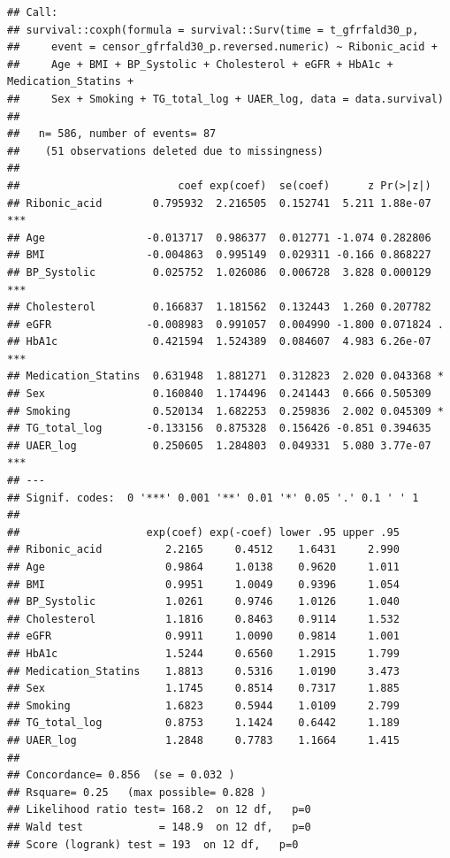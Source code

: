 \documentclass[]{article}
\begin{document}
\begin{verbatim}
## Call:
## survival::coxph(formula = survival::Surv(time = t_gfrfald30_p, 
##     event = censor_gfrfald30_p.reversed.numeric) ~ Ribonic_acid + 
##     Age + BMI + BP_Systolic + Cholesterol + eGFR + HbA1c + Medication_Statins + 
##     Sex + Smoking + TG_total_log + UAER_log, data = data.survival)
## 
##   n= 586, number of events= 87 
##    (51 observations deleted due to missingness)
## 
##                         coef exp(coef)  se(coef)      z Pr(>|z|)    
## Ribonic_acid        0.795932  2.216505  0.152741  5.211 1.88e-07 ***
## Age                -0.013717  0.986377  0.012771 -1.074 0.282806    
## BMI                -0.004863  0.995149  0.029311 -0.166 0.868227    
## BP_Systolic         0.025752  1.026086  0.006728  3.828 0.000129 ***
## Cholesterol         0.166837  1.181562  0.132443  1.260 0.207782    
## eGFR               -0.008983  0.991057  0.004990 -1.800 0.071824 .  
## HbA1c               0.421594  1.524389  0.084607  4.983 6.26e-07 ***
## Medication_Statins  0.631948  1.881271  0.312823  2.020 0.043368 *  
## Sex                 0.160840  1.174496  0.241443  0.666 0.505309    
## Smoking             0.520134  1.682253  0.259836  2.002 0.045309 *  
## TG_total_log       -0.133156  0.875328  0.156426 -0.851 0.394635    
## UAER_log            0.250605  1.284803  0.049331  5.080 3.77e-07 ***
## ---
## Signif. codes:  0 '***' 0.001 '**' 0.01 '*' 0.05 '.' 0.1 ' ' 1
## 
##                    exp(coef) exp(-coef) lower .95 upper .95
## Ribonic_acid          2.2165     0.4512    1.6431     2.990
## Age                   0.9864     1.0138    0.9620     1.011
## BMI                   0.9951     1.0049    0.9396     1.054
## BP_Systolic           1.0261     0.9746    1.0126     1.040
## Cholesterol           1.1816     0.8463    0.9114     1.532
## eGFR                  0.9911     1.0090    0.9814     1.001
## HbA1c                 1.5244     0.6560    1.2915     1.799
## Medication_Statins    1.8813     0.5316    1.0190     3.473
## Sex                   1.1745     0.8514    0.7317     1.885
## Smoking               1.6823     0.5944    1.0109     2.799
## TG_total_log          0.8753     1.1424    0.6442     1.189
## UAER_log              1.2848     0.7783    1.1664     1.415
## 
## Concordance= 0.856  (se = 0.032 )
## Rsquare= 0.25   (max possible= 0.828 )
## Likelihood ratio test= 168.2  on 12 df,   p=0
## Wald test            = 148.9  on 12 df,   p=0
## Score (logrank) test = 193  on 12 df,   p=0
\end{verbatim}
\end{document}

